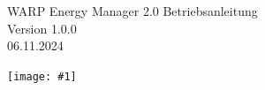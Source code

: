 \documentclass[a4paper,10pt]{article}
\title{}
\author{}
\newcommand{\gfx}[1]{\texttt{[image: \#1]}}
\begin{document}
\pagestyle{empty}
\begin{titlepage}
	\vspace*{-3.08cm}
	\colorbox{boxgray}{}
	\vfill
	\begin{center}
		\Huge
        \color{white}
		WARP Energy Manager 2.0 Betriebsanleitung\\\vspace{1cm}
		\large
		Version 1.0.0\\\vspace{0.25cm}
		06.11.2024
	\end{center}
	\vspace*{1cm} \gfx{./img_v2/warp-energy-manager2.png}
    \vfill
   	\pagecolor{covergray}

\end{titlepage}
\newpage
\pagecolor{white}
\null
\newpage
\pagestyle{fancy}
\end{document}
